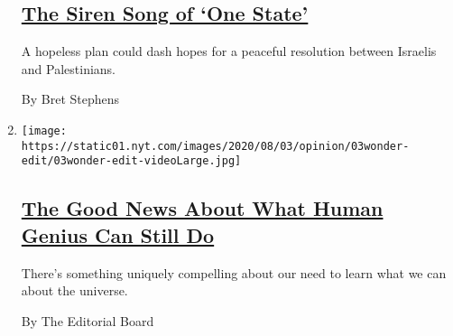 \begin{enumerate}
{  \subsection{\texorpdfstring{\href{/2020/08/03/opinion/israel-palestine-one-state-solution.html}{The
  Siren Song of `One
  State'}}{The Siren Song of `One State'}}\label{the-siren-song-of-one-state}}

  A hopeless plan could dash hopes for a peaceful resolution between
  Israelis and Palestinians.

  By Bret Stephens
\item
  \texttt{[image: https://static01.nyt.com/images/2020/08/03/opinion/03wonder-edit/03wonder-edit-videoLarge.jpg]}

  \hypertarget{the-good-news-about-what-human-genius-can-still-do}{%
  \subsection{\texorpdfstring{\href{/2020/08/03/opinion/spacex-stonehenge-mars.html}{The
  Good News About What Human Genius Can Still
  Do}}{The Good News About What Human Genius Can Still Do}}\label{the-good-news-about-what-human-genius-can-still-do}}

  There's something uniquely compelling about our need to learn what we
  can about the universe.

  By The Editorial Board
\end{enumerate}

